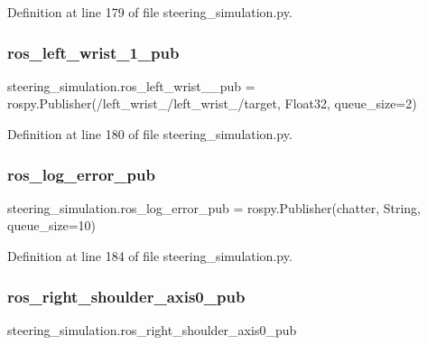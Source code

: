 Definition at line 179 of file steering\+\_\+simulation.\+py.

\mbox{\label{namespacesteering__simulation_ab5f317214f6776ddc111dee9afe1f0c3}} 
\subsubsection{\texorpdfstring{ros\_left\_wrist\_1\_pub}{ros\_left\_wrist\_1\_pub}}
{\footnotesize\ttfamily steering\+\_\+simulation.\+ros\+\_\+left\+\_\+wrist\+\_\+\_\+pub = rospy.\+Publisher(\textquotesingle{}/left\+\_\+wrist\+\_/left\+\_\+wrist\+\_/target\textquotesingle{}, Float32, queue\+\_\+size=2)}



Definition at line 180 of file steering\+\_\+simulation.\+py.

\mbox{\label{namespacesteering__simulation_af24aa0340a9184e1a00a96bc8d68aef8}} 
\subsubsection{\texorpdfstring{ros\_log\_error\_pub}{ros\_log\_error\_pub}}
{\footnotesize\ttfamily steering\+\_\+simulation.\+ros\+\_\+log\+\_\+error\+\_\+pub = rospy.\+Publisher(\textquotesingle{}chatter\textquotesingle{}, String, queue\+\_\+size=10)}



Definition at line 184 of file steering\+\_\+simulation.\+py.

\mbox{\label{namespacesteering__simulation_a7824803c03df4637e22449c926522d6d}} 
\subsubsection{\texorpdfstring{ros\_right\_shoulder\_axis0\_pub}{ros\_right\_shoulder\_axis0\_pub}}
{\footnotesize\ttfamily steering\+\_\+simulation.\+ros\+\_\+right\+\_\+shoulder\+\_\+axis0\+\_\+pub}

